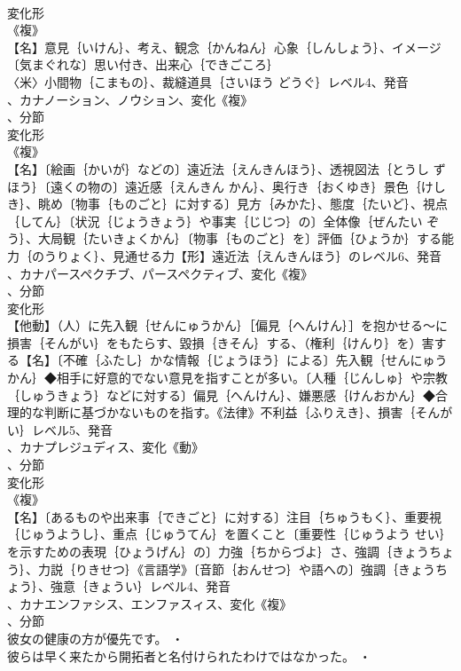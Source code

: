 \documentclass[8pt]{extreport}
\begin{document}
\begin{CJK}{UTF8}{min}
\\	変化形 
\\	《複》
\\	【名】意見｛いけん｝、考え、観念｛かんねん｝心象｛しんしょう｝、イメージ〔気まぐれな〕思い付き、出来心｛できごころ｝
\\	〈米〉小間物｛こまもの｝、裁縫道具｛さいほう どうぐ｝レベル4、発音
\\	、カナノーション、ノウション、変化《複》
\\	、分節
\\	変化形 
\\	《複》
\\	【名】〔絵画｛かいが｝などの〕遠近法｛えんきんほう｝、透視図法｛とうし ずほう｝〔遠くの物の〕遠近感｛えんきん かん｝、奥行き｛おくゆき｝景色｛けしき｝、眺め〔物事｛ものごと｝に対する〕見方｛みかた｝、態度｛たいど｝、視点｛してん｝〔状況｛じょうきょう｝や事実｛じじつ｝の〕全体像｛ぜんたい ぞう｝、大局観｛たいきょくかん｝〔物事｛ものごと｝を〕評価｛ひょうか｝する能力｛のうりょく｝、見通せる力【形】遠近法｛えんきんほう｝のレベル6、発音
\\	、カナパースペクチブ、パースペクティブ、変化《複》
\\	、分節
\\	変化形 
\\	【他動】（人）に先入観｛せんにゅうかん｝［偏見｛へんけん｝］を抱かせる～に損害｛そんがい｝をもたらす、毀損｛きそん｝する、（権利｛けんり｝を）害する【名】〔不確｛ふたし｝かな情報｛じょうほう｝による〕先入観｛せんにゅうかん｝◆相手に好意的でない意見を指すことが多い。〔人種｛じんしゅ｝や宗教｛しゅうきょう｝などに対する〕偏見｛へんけん｝、嫌悪感｛けんおかん｝◆合理的な判断に基づかないものを指す。《法律》不利益｛ふりえき｝、損害｛そんがい｝レベル5、発音
\\	、カナプレジュディス、変化《動》
\\	、分節
\\	変化形 
\\	《複》
\\	【名】〔あるものや出来事｛できごと｝に対する〕注目｛ちゅうもく｝、重要視｛じゅうようし｝、重点｛じゅうてん｝を置くこと〔重要性｛じゅうよう せい｝を示すための表現｛ひょうげん｝の〕力強｛ちからづよ｝さ、強調｛きょうちょう｝、力説｛りきせつ｝《言語学》〔音節｛おんせつ｝や語への〕強調｛きょうちょう｝、強意｛きょうい｝レベル4、発音
\\	、カナエンファシス、エンファスィス、変化《複》
\\	、分節
\\	彼女の健康の方が優先です。 ・
\\	彼らは早く来たから開拓者と名付けられたわけではなかった。 ・

\end{CJK}
\end{document}
